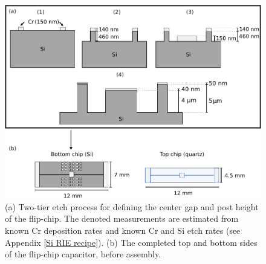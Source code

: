 \documentclass[double,12pt,1in,seploa]{beavtex}
\begin{document}
\begin{figure}
    \includegraphics[width=1\textwidth]{Two-tier etch.pdf}
    \caption{(a) Two-tier etch process for defining the center gap and post height of the flip-chip. The denoted measurements are estimated from known Cr deposition rates and known Cr and Si etch rates (see Appendix \ref{Si RIE recipe}). (b) The completed top and bottom sides of the flip-chip capacitor, before assembly.}
    \label{twotier}
\end{figure}
\end{document}
